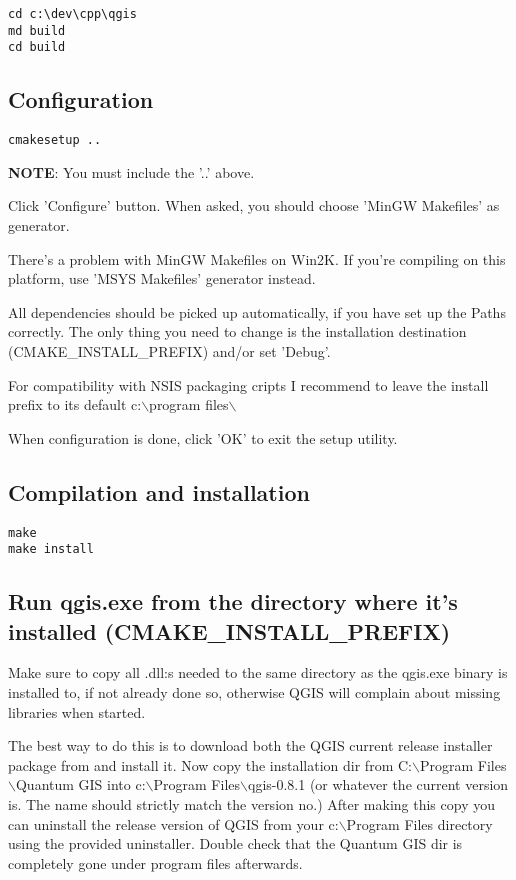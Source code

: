 \begin{verbatim}
cd c:\dev\cpp\qgis 
md build 
cd build 
\end{verbatim}

\subsection{Configuration}
\begin{verbatim}
cmakesetup ..  
\end{verbatim}

\textbf{NOTE}: You must include the '..' above.

Click 'Configure' button.  When asked, you should choose 'MinGW Makefiles'
as generator.

There's a problem with MinGW Makefiles on Win2K. If you're compiling on this
platform, use 'MSYS Makefiles' generator instead.

All dependencies should be picked up automatically, if you have set up the
Paths correctly. The only thing you need to change is the installation
destination (CMAKE\_INSTALL\_PREFIX) and/or set 'Debug'.

For compatibility with NSIS packaging cripts I recommend to leave the
install prefix to its default c:$\backslash$program files$\backslash$

When configuration is done, click 'OK' to exit the setup utility.

\subsection{Compilation and installation}
\begin{verbatim}
make 
make install 
\end{verbatim}

\subsection{Run qgis.exe from the directory where it's installed (CMAKE\_INSTALL\_PREFIX)}
Make sure to copy all .dll:s needed to the same directory as the qgis.exe
binary is installed to, if not already done so, otherwise QGIS will complain
about missing libraries when started.

The best way to do this is to download both the QGIS current release installer
package from  and install it. Now copy
the installation dir from C:$\backslash$Program Files$\backslash$Quantum GIS into c:$\backslash$Program
Files$\backslash$qgis-0.8.1 (or whatever the current version is. The name should strictly
match the version no.) After making this copy you can uninstall the release
version of QGIS from your c:$\backslash$Program Files directory using the provided
uninstaller. Double check that the Quantum GIS dir is completely gone under
program files afterwards.

